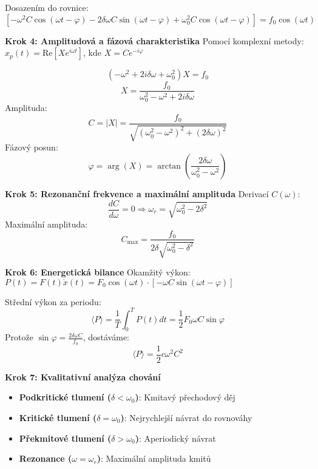 \begin{example}
Dosazením do rovnice:
\[
[-\omega^2 C\cos(\omega t - \varphi) - 2\delta\omega C\sin(\omega t - \varphi) + \omega_0^2 C\cos(\omega t - \varphi)] = f_0\cos(\omega t)
\]

\vspace{1\baselineskip}

\noindent\textbf{Krok 4: Amplitudová a fázová charakteristika}
Pomocí komplexní metody: $x_p(t) = \text{Re}[X e^{i\omega t}]$, kde $X = Ce^{-i\varphi}$

\[
(-\omega^2 + 2i\delta\omega + \omega_0^2)X = f_0
\]
\[
X = \frac{f_0}{\omega_0^2 - \omega^2 + 2i\delta\omega}
\]
Amplituda:
\[
C = |X| = \frac{f_0}{\sqrt{(\omega_0^2 - \omega^2)^2 + (2\delta\omega)^2}}
\]
Fázový posun:
\[
\varphi = \arg(X) = \arctan\left(\frac{2\delta\omega}{\omega_0^2 - \omega^2}\right)
\]

\vspace{1\baselineskip}

\noindent\textbf{Krok 5: Rezonanční frekvence a maximální amplituda}
Derivací $C(\omega)$:
\[
\frac{dC}{d\omega} = 0 \Rightarrow \omega_r = \sqrt{\omega_0^2 - 2\delta^2}
\]
Maximální amplituda:
\[
C_{\text{max}} = \frac{f_0}{2\delta\sqrt{\omega_0^2 - \delta^2}}
\]

\vspace{1\baselineskip}

\noindent\textbf{Krok 6: Energetická bilance}
Okamžitý výkon: $P(t) = F(t)\dot{x}(t) = F_0\cos(\omega t) \cdot [-\omega C\sin(\omega t - \varphi)]$

Střední výkon za periodu:
\[
\langle P \rangle = \frac{1}{T}\int_0^T P(t)dt = \frac{1}{2}F_0\omega C\sin\varphi
\]
Protože $\sin\varphi = \frac{2\delta\omega C}{f_0}$, dostáváme:
\[
\langle P \rangle = \frac{1}{2}c\omega^2 C^2
\]

\vspace{1\baselineskip}

\noindent\textbf{Krok 7: Kvalitativní analýza chování}
\begin{itemize}
\item \textbf{Podkritické tlumení ($\delta < \omega_0$)}: Kmitavý přechodový děj
\item \textbf{Kritické tlumení ($\delta = \omega_0$)}: Nejrychlejší návrat do rovnováhy
\item \textbf{Překmitové tlumení ($\delta > \omega_0$)}: Aperiodický návrat
\item \textbf{Rezonance ($\omega = \omega_r$)}: Maximální amplituda kmitů
\end{itemize}


\end{example}
